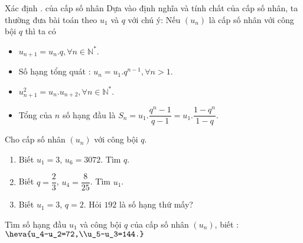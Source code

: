 \newpage
\begin{dang}{Xác định .  của cấp số nhân}
	Dựa vào định nghĩa và tính chất của cấp số nhân, ta thường đưa bài toán theo $u_1$ và $q$ với chú ý: Nếu $(u_n)$ là cấp số nhân với công bội $q$ thì ta có
	\begin{itemize}
		\item $u_{n+1}=u_n.q,\forall n\in\mathbb{N^*}$.
		\item Số hạng tổng quát : $u_n=u_1.q^{n-1},\forall n>1$.
		\item $u^2_{n+1}=u_n.u_{n+2}, \forall n\in\mathbb{N^*}$.
		\item Tổng của $n$ số hạng đầu là $S_n=u_1.\dfrac{q^n-1}{q-1}=u_1.\dfrac{1-q^n}{1-q}$.
	\end{itemize}
\end{dang}
\begin{vd}%
	Cho cấp số nhân $(u_n)$ với công bội $q$. 
	\begin{enumerate}
		\item Biết $u_1=3$, $u_6=3072$. Tìm $q$.
		\item Biết $q=\dfrac{2}{3}$, $u_4=\dfrac{8}{25}$. Tìm $u_1$.
		\item Biết $u_1=3$, $q=2$. Hỏi $192$ là số hạng thứ mấy? 
	\end{enumerate}
\end{vd}
\begin{vd}%
	Tìm số hạng đầu $u_1$ và công bội $q$ của cấp số nhân $(u_n)$, biết : $\heva{u_4-u_2=72,\\u_5-u_3=144.}$ 
\end{vd}
